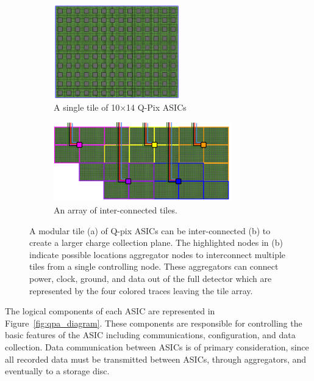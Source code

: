 \begin{figure}[]
\centering
\begin{subfigure}[t]{.5\textwidth}
  \centering
  \includegraphics[width=0.6\textwidth]{images/single_tile_qpix.png}
  \caption{A single tile of 10$\times$14 Q-Pix ASICs}
\end{subfigure}%
\begin{subfigure}[t]{.5\textwidth}
  \centering
  \includegraphics[width=0.85\textwidth]{images/array_of_tiles_qpix.png}
  \caption{An array of inter-connected tiles.}
\end{subfigure}
\caption{A modular tile (a) of Q-pix ASICs can be inter-connected (b) to create a larger charge collection plane. 
The highlighted nodes in (b) indicate possible locations aggregator nodes to interconnect multiple tiles from a single controlling node.
These aggregators can connect power, clock, ground, and data out of the full detector which are represented by the four colored traces leaving the tile array.
}
\label{fig:qpix_tile_introduction}
\end{figure}

The logical components of each ASIC are represented in Figure~\ref{fig:qpa_diagram}.
These components are responsible for controlling the basic features of the ASIC including communications, configuration, and data collection.
Data communication between ASICs is of primary consideration, since all recorded data must be transmitted between ASICs, through aggregators, and eventually to a storage disc.

